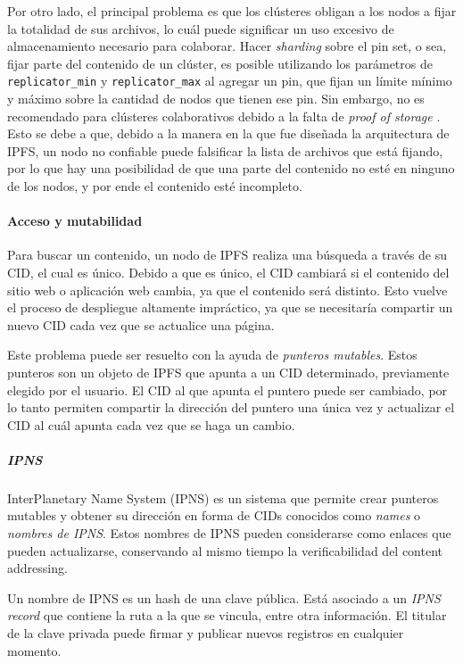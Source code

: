 Por otro lado, el principal problema es que los clústeres obligan a los nodos a fijar la totalidad de sus archivos, lo cuál puede significar un uso excesivo de almacenamiento necesario para colaborar. Hacer \textit{sharding} sobre el pin set, o sea, fijar parte del contenido de un clúster, es posible utilizando los parámetros de \texttt{replicator\_min} y \texttt{replicator\_max} al agregar un pin, que fijan un límite mínimo y máximo sobre la cantidad de nodos que tienen ese pin. Sin embargo, no es recomendado para clústeres colaborativos debido a la falta de \textit{proof of storage} \cite{cluster-sharding} \cite{collaborative-clusters-setup}. Esto se debe a que, debido a la manera en la que fue diseñada la arquitectura de IPFS, un nodo no confiable puede falsificar la lista de archivos que está fijando, por lo que hay una posibilidad de que una parte del contenido no esté en ninguno de los nodos, y por ende el contenido esté incompleto.

\paragraph{Acceso y mutabilidad}

Para buscar un contenido, un nodo de IPFS realiza una búsqueda a través de su CID, el cual es único. Debido a que es único, el CID cambiará si el contenido del sitio web o aplicación web cambia, ya que el contenido será distinto. Esto vuelve el proceso de despliegue altamente impráctico, ya que se necesitaría compartir un nuevo CID cada vez que se actualice una página.

Este problema puede ser resuelto con la ayuda de \textit{punteros mutables}. Estos punteros son un objeto de IPFS que apunta a un CID determinado, previamente elegido por el usuario. El CID al que apunta el puntero puede ser cambiado, por lo tanto permiten compartir la dirección del puntero una única vez y actualizar el CID al cuál apunta cada vez que se haga un cambio.

\subparagraph{IPNS}

InterPlanetary Name System (IPNS) \cite{ipns} es un sistema que permite crear  punteros mutables y obtener su dirección en forma de CIDs conocidos como \textit{names} o \textit{nombres de IPNS}. Estos nombres de IPNS pueden considerarse como enlaces que pueden actualizarse, conservando al mismo tiempo la verificabilidad del content addressing.

Un nombre de IPNS es un hash de una \cite{ipns-hash} clave pública. Está asociado a un \textit{IPNS record} \cite{ipns-record} que contiene la ruta a la que se vincula, entre otra información. El titular de la clave privada puede firmar y publicar nuevos registros en cualquier momento.

